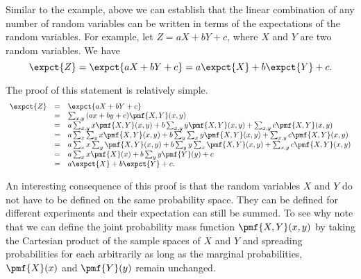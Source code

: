 \begin{cluster}
\label{grp:grm:probability::expectation::similar}

\begin{gram}
\label{grm:probability::expectation::similar}
Similar to the example, above we can establish that the linear
combination of any number of random variables can be written in terms
of the expectations of the random variables.  For example, let $Z = aX
+ bY + c$, where $X$ and $Y$ are two random variables. We have
\[
\expct{Z} = \expct{aX + bY + c} = a\expct{X} + b \expct{Y} + c.
\]

The proof of this statement is relatively simple.
\[
\begin{array}{lll}
\expct{Z} & = & \expct{aX + bY + c} 
\\
& = & \sum_{x,y}{(ax + by + c) \pmf{X,Y}(x,y)}
\\
& = & a\sum_{x,y}{x \pmf{X,Y}(x,y)} + b\sum_{x,y}{y \pmf{X,Y}(x,y)} + \sum_{x,y}{c \pmf{X,Y}(x,y)}
\\
& = & a\sum_{x}\sum_{y}{x \pmf{X,Y}(x,y)} + b\sum_{y}\sum_x{y  \pmf{X,Y}(x,y)} + \sum_{x,y}{c \pmf{X,Y}(x,y)}
\\
& = & a\sum_{x}x\sum_{y}{\pmf{X,Y}(x,y)} + b\sum_{y} y \sum_x{\pmf{X,Y}(x,y)} + \sum_{x,y}{c \pmf{X,Y}(x,y)}
\\
& = & a\sum_{x}x{\pmf{X}(x) + b\sum_{y} y \pmf{Y}(y)} + c
\\
& = & a \expct{X} + b \expct{Y} + c.
\end{array}
\]

An interesting consequence of this proof is that the random variables
$X$ and $Y$ do not have to be defined on the same probability space.
They can be defined for different experiments and their expectation
can still be summed.
To see why note that we can define the joint probability mass function
$\pmf{X,Y}(x,y)$ by taking the Cartesian product of the sample spaces
of $X$ and $Y$ and spreading probabilities for each arbitrarily as
long as the marginal probabilities, $\pmf{X}(x)$ and $\pmf{Y}(y)$
remain unchanged.

\end{gram}
\end{cluster}

